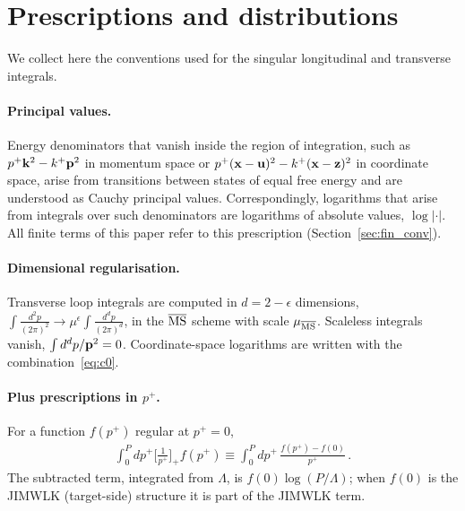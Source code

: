 \section{Prescriptions and distributions}\label{app:distributions}

We collect here the conventions used for the singular longitudinal and transverse integrals.

\paragraph{Principal values.} Energy denominators that vanish inside the region of integration, such as $p^+\mathbf{k}^2-k^+\mathbf{p}^2$ in momentum space or $p^+(\mathbf{x}-\mathbf{u})^2-k^+(\mathbf{x}-\mathbf{z})^2$ in coordinate space, arise from transitions between states of equal free energy and are understood as Cauchy principal values. Correspondingly, logarithms that arise from integrals over such denominators are logarithms of absolute values, $\log|\cdot|$. All finite terms of this paper refer to this prescription (Section~\ref{sec:fin_conv}).

\paragraph{Dimensional regularisation.} Transverse loop integrals are computed in $d=2-\epsilon$ dimensions, $\int\frac{d^2p}{(2\pi)^2}\to\mu^{\epsilon}\int\frac{d^dp}{(2\pi)^d}$, in the $\overline{\rm MS}$ scheme with scale $\mu_{\overline{\rm MS}}$. Scaleless integrals vanish, $\int d^dp/\mathbf{p}^2=0$. Coordinate-space logarithms are written with the combination~\eqref{eq:c0}.

\paragraph{Plus prescriptions in $p^+$.} For a function $f(p^+)$ regular at $p^+=0$,
\begin{align}\label{eq:plusp}
\int_0^{P}dp^+\Big[\frac{1}{p^+}\Big]_+f(p^+)\equiv\int_0^{P}dp^+\,\frac{f(p^+)-f(0)}{p^+}\,.
\end{align}
The subtracted term, integrated from $\Lambda$, is $f(0)\log(P/\Lambda)$; when $f(0)$ is the JIMWLK (target-side) structure it is part of the JIMWLK term.


